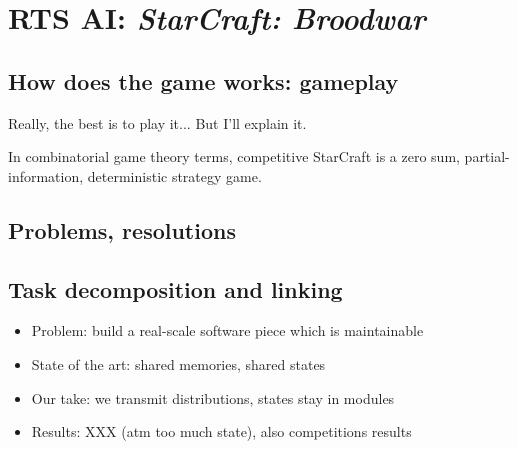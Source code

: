 \chapter{RTS AI: \textit{StarCraft: Broodwar}}

\section{How does the game works: gameplay}
Really, the best is to play it... But I'll explain it.

In combinatorial game theory terms, competitive StarCraft is a zero sum, partial-information, deterministic strategy game.

\section{Problems, resolutions}

\section{Task decomposition and linking}
\begin{itemize}
\item Problem: build a real-scale software piece which is maintainable
\item State of the art: shared memories, shared states
\item Our take: we transmit distributions, states stay in modules
\item Results: XXX (atm too much state), also competitions results
\end{itemize}
